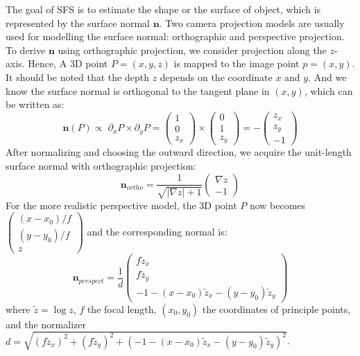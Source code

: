 The goal of SFS is to estimate the shape or the surface of object, which is represented by the surface normal $\mathbf{n}$.
Two camera projection models are usually used for modelling the surface normal: orthographic and perspective projection.
To derive $\mathbf{n}$ using orthographic projection, we consider projection along the $z$-axis\cite{hartley2003multiple}.
Hence, A 3D point $P = (x,y,z)$ is mapped to the image point $p = (x,y)$.
It should be noted that the depth $z$ depends on the coordinate $x$ and $y$.
And we know the surface normal is orthogonal to the tangent plane in $(x,y)$, which can be written as:
\begin{equation}
    \mathbf{n}(P) \propto \; \partial_x P \times \partial_y P 
    = \begin{pmatrix} 1 \\ 0 \\ z_x\end{pmatrix}
    \times \begin{pmatrix} 0 \\ 1 \\ z_y\end{pmatrix}
    = -\begin{pmatrix} z_x \\ z_y \\ -1\end{pmatrix}
\end{equation}
After normalizing and choosing the outward direction, we acquire the unit-length surface normal with orthographic projection:
\begin{equation}
    \mathbf{n}_{ortho} = \frac{1}{\sqrt{|\nabla z| + 1}} \begin{pmatrix} \nabla z \\ -1\end{pmatrix}
\end{equation}
For the more realistic perspective model, the 3D point $P$ now becomes $\begin{pmatrix} (x - x_0)/f \\ (y - y_0)/f\\ z\end{pmatrix}$ and the corresponding normal is:
\begin{equation}\label{eq:ratio_normal}
    \mathbf{n}_{perspect} =
    \frac{1}{d}
     \begin{pmatrix}
         f\tilde{z}_x\\
         f\tilde{z}_y\\
         -1 - (x-x_0)\tilde{z}_x - (y - y_0)\tilde{z}_y
     \end{pmatrix}
\end{equation}
where $\tilde{z} = \log{z}$, $f$ the focal length, $(x_0, y_0)$ the coordinates of principle points, and the normalizer $d =  \sqrt{(f\tilde{z}_x)^2 + (f\tilde{z}_y)^2 + (-1 - (x-x_0)\tilde{z}_x - (y - y_0)\tilde{z}_y)^2}$.

